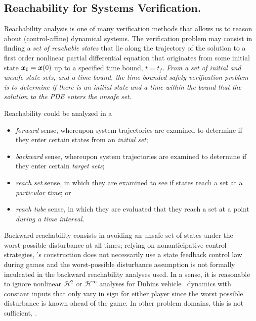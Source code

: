 \subsection{Reachability for Systems Verification.}
\noindent Reachability analysis is one of many verification methods that allows us to reason about (control-affine) dynamical systems. %
The verification problem may consist in finding a \textit{set of reachable states} that lie along the trajectory of the solution to a first order nonlinear partial differential equation that originates from some initial state $\bm{x}_0 = \bm{x}(0)$ up to a specified time bound, $t=t_f$. \textit{From a set of initial and unsafe state sets, and a time bound, the time-bounded safety verification problem is to determine if there is an initial state and a time within the bound that the solution to the PDE enters the unsafe set}.

Reachability could be analyzed in a 
%
\begin{itemize}%
	\item \textit{forward} sense, whereupon system trajectories are examined to determine if they enter certain states from an \textit{initial set};
	\item \textit{backward} sense, whereupon system trajectories are examined to determine if they enter certain \textit{target sets};
	\item \textit{reach set} sense, in which they are examined to see if states reach a set at a \textit{particular time}; or
	\item \textit{reach tube} sense, in which they are evaluated that they reach a set at a point \textit{during a time interval}.	
\end{itemize} 

Backward reachability consists in avoiding an unsafe set of states under the worst-possible disturbance at all times; relying on nonanticipative control strategies, \cite{Mitchell2005}'s construction does not necessarily use a state feedback control law during games and the worst-possible disturbance assumption is not formally inculcated in the backward reachability analyses used. In a sense, it is reasonable to ignore nonlinear $\mathcal{H}^2$ or $\mathcal{H}^\infty$ analyses for Dubins vehicle~\cite{Dubins1957} dynamics with constant inputs that only vary in sign for either player \cite{Merz1972} since the worst possible disturbance is known ahead of the game. In other problem domains, this is not sufficient, . 

